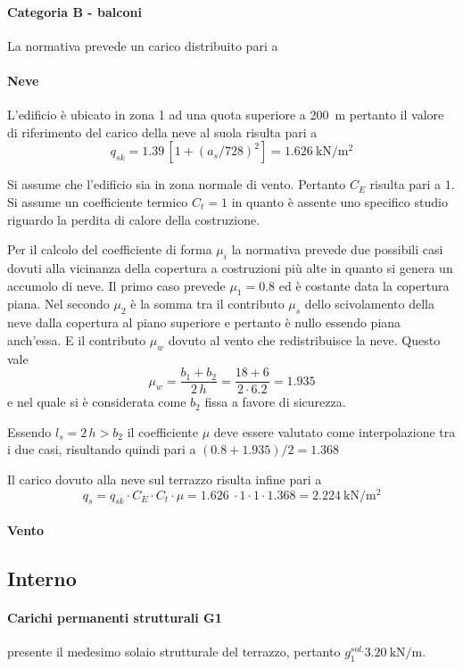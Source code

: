 \paragraph*{Categoria B - balconi} La normativa prevede un carico distribuito pari a 
\paragraph*{Neve}
L'edificio è ubicato in zona 1 ad una quota superiore a \SI{200}{\meter} pertanto il valore di riferimento del carico della neve al suola risulta pari a
\[
	q_{sk}=1.39 \, [1+(a_s/728)^2] = \SI{1.626}{\kilo\newton\per\square\meter}
\]

Si assume che l'edificio sia in zona normale di vento. Pertanto $C_E$ risulta pari a $1$.
Si assume un coefficiente termico $C_t = 1$ in quanto è assente uno specifico studio riguardo la perdita di calore della costruzione. 

Per il calcolo del coefficiente di forma $\mu_i$ la normativa prevede due possibili casi dovuti alla vicinanza della copertura a costruzioni più alte in quanto si genera un accumolo di neve.
Il primo caso prevede $\mu_1=0.8$ ed è costante data la copertura piana. Nel secondo $\mu_2$ è la somma tra il contributo $\mu_s$ dello scivolamento della neve dalla copertura al piano superiore e pertanto è nullo essendo piana anch'essa. 
E il contributo $\mu_w$ dovuto al vento che redistribuisce la neve. 
Questo vale 
\[\mu_w=\frac{b_1 + b_2}{2\,h}=\frac{18+6}{2\cdot6.2}=1.935\] e nel quale si è considerata come $b_2$ fissa a favore di sicurezza.

Essendo $l_s=2\,h>b_2$ il coefficiente $\mu$ deve essere valutato come interpolazione tra i due casi, risultando quindi pari a $(0.8 + 1.935)/2 = 1.368$

Il carico dovuto alla neve sul terrazzo risulta infine pari a 
\[
q_s = q_{sk} \cdot C_E \cdot C_t \cdot \mu = \SI{1.626}{} \cdot 1 \cdot 1 \cdot 1.368 = \SI{2.224}{\kilo\newton\per\square\meter}
\]
\paragraph*{Vento}
\subsection{Interno}
\paragraph*{Carichi permanenti strutturali G1}
\e presente il medesimo solaio strutturale del terrazzo, pertanto $g_1^{sol.}\SI{3.20}{\kilo\newton\per\meter}$.
